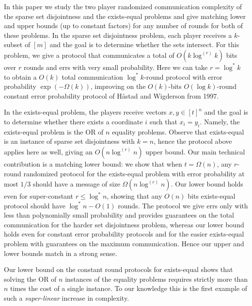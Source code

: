
\renewenvironment{abstract}{\small \list{}{%
    \setlength{\leftmargin}{2em}%
    \setlength{\rightmargin}{\leftmargin}%
    \listparindent 1.4em%
  }\item{}}{\endlist}
  
\begin{abstract}
In this paper we study the two player randomized communication
complexity of the sparse set disjointness and the exists-equal 
problems and give matching lower and upper bounds (up to 
constant factors) for any number of rounds for both of these
problems. In the sparse set disjointness problem, each player
receives a $k$-subset of $[m]$ and the goal is to determine
whether the sets intersect. For this problem, we give a 
protocol that communicates a total of $O(k\log^{(r)}k)$ bits 
over $r$ rounds and errs with very small probability.
Here we can take $r=\log^{*}k$ to obtain a $O(k)$ total
communication $\log^{*}k$-round protocol with error 
probability $\exp(-\Omega(k))$, improving on the $O(k)$-bits 
$O(\log k)$-round constant error probability protocol of 
Håstad and Wigderson from 1997.

In the exists-equal problem, the players receive vectors 
$x,y\in[t]^n$ and the goal is to determine whether there exists
a coordinate $i$ such that $x_i=y_i$. Namely, the exists-equal 
problem is the OR of $n$ equality problems. Observe that
exists-equal is an instance of sparse set disjointness with
$k=n$, hence the protocol above applies here as well, giving 
an $O(n\log^{(r)}n)$ upper bound.
Our main technical contribution is a matching 
lower bound: we show that when $t=\Omega(n)$, any $r$-round
randomized protocol for the exists-equal problem with error 
probability at most $1/3$ should have a message of size 
$\Omega(n\log^{(r)}n)$. Our lower bound holds even for 
super-constant $r\le \log^*n$, showing that any $O(n)$ bits 
exists-equal protocol should have $\log^*n - O(1)$ rounds. 
The protocol we give errs only with less than 
polynomially small probability and provides guarantees on the 
total communication for the harder set disjointness problem, 
whereas our lower bound holds even for constant error 
probability protocols and for the easier exists-equal problem 
with guarantees on the maximum communication. Hence our upper and 
lower bounds match in a strong sense.

Our lower bound on the constant round protocols for
exists-equal shows that solving the OR of $n$ instances of the 
equality problems requires strictly more than $n$ times the cost 
of a single instance. To our knowledge this is the first example 
of such a {\em super-linear} increase in complexity.
\end{abstract}

